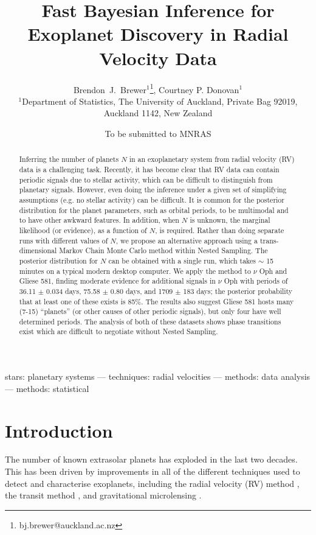 \documentclass[useAMS,usenatbib]{mn2e}
\title[]
{Fast Bayesian Inference for Exoplanet Discovery in Radial Velocity Data}
\author[Brewer and Donovan]{%
  Brendon~J.~Brewer$^{1}$\thanks{bj.brewer@auckland.ac.nz},
  Courtney P. Donovan$^{1}$
  \medskip\\
  $^1$Department of Statistics, The University of Auckland, Private Bag 92019, Auckland 1142, New Zealand}
\begin{document}
             
\date{To be submitted to MNRAS}
             
\maketitle

\label{firstpage}


\begin{abstract}
Inferring the number of planets $N$ in an exoplanetary system from radial velocity
(RV) data is a challenging task. Recently, it has become clear that RV data
can contain periodic signals due to stellar activity, which can be difficult
to distinguish from planetary signals. However, even doing the inference
under a given set of simplifying assumptions (e.g. no stellar activity) can
be difficult. It is common for the posterior distribution for the
planet parameters, such as orbital periods,
to be multimodal and to have other awkward features. In
addition, when $N$ is unknown, the marginal likelihood (or evidence), as a
function of $N$, is required. Rather than doing separate runs with different
values of $N$, we propose an alternative
approach using a trans-dimensional Markov Chain Monte Carlo method within
Nested Sampling. The posterior distribution for $N$ can be obtained with a
single run, which takes $\sim$ 15 minutes on a typical modern desktop computer.
We apply the method to $\nu$ Oph and Gliese 581, finding moderate evidence
for additional signals in
$\nu$ Oph with periods of 36.11 $\pm$ 0.034 days,
75.58 $\pm$ 0.80 days, and 1709 $\pm$ 183 days;
the posterior probability that at least one of these
exists is 85\%. The results also suggest Gliese 581 hosts many (7-15) ``planets''
(or other causes of other periodic
signals), but only four have well determined periods. The analysis of both
of these datasets shows phase transitions exist which are difficult to
negotiate without Nested Sampling.
\end{abstract}

\begin{keywords}
stars: planetary systems --- techniques: radial velocities ---
methods: data analysis --- methods: statistical
\end{keywords}


\section{Introduction}
The number of known extrasolar planets has exploded in the last two
decades. This has been driven by improvements in
all of the different techniques used to detect and characterise exoplanets,
including the radial velocity (RV) method \citep[e.g.][]{2012PASJ...64..135S},
the transit method \citep[e.g.]{2014PNAS..11112647B},
and gravitational microlensing
\citep[e.g.][]{2014ApJ...785..155B, 2014ApJ...790...14Y}.
\end{document}
